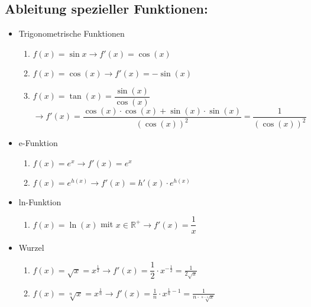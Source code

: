 \documentclass[a4paper,twocolumn,10pt]{onepgnote}
\begin{document}
\subsection{Ableitung spezieller Funktionen:}
\begin{itemize}
\item Trigonometrische Funktionen\\
\begin{enumerate} \item $f(x)= \sin{x} \longrightarrow f'(x) = \cos(x)$\\
\item $f(x)= \cos(x) \longrightarrow f'(x) = -\sin(x)$\\
\item $f(x) = \tan(x)= \dfrac{\sin(x)}{\cos(x)}$ \\$ \longrightarrow f'(x) = \dfrac{\cos(x) \cdot \cos(x) + \sin(x) \cdot \sin(x)}{(\cos(x))^2} = \dfrac{1}{(\cos(x))^2}$
\end{enumerate}
\item e-Funktion\\ \begin{enumerate} \item $f(x) = e^x \longrightarrow f'(x) = e^x$ \\ \item $f(x) = e^{h(x) } \longrightarrow f'(x) = h'(x) \cdot e^{h(x)}$\end{enumerate}
\item ln-Funktion\\ \begin{enumerate} \item $f(x) = \ln(x)$ mit $x\in \mathds{R}^+ \longrightarrow f'(x) = \dfrac{1}{x}$ \end{enumerate}
\item Wurzel\\ \begin{enumerate}\item $f(x) = \sqrt{x} = x^{\frac{1}{2}} \longrightarrow f'(x) = \dfrac{1}{2} \cdot x^{-\frac{1}{2}} = \frac{1}{2\sqrt{x}}$\\ \item $f(x)= \sqrt[n]{x} = x^{\frac{1}{n}} \longrightarrow f'(x) = \frac{1}{n} \cdot x^{\frac{1}{n} -1} = \frac{1}{n\cdot \sqrt[{n-1}]{x}}$\end{enumerate}
\end{itemize}
\end{document}
